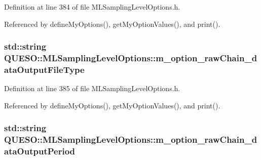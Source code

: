 Definition at line 384 of file M\-L\-Sampling\-Level\-Options.\-h.



Referenced by define\-My\-Options(), get\-My\-Option\-Values(), and print().

\hypertarget{class_q_u_e_s_o_1_1_m_l_sampling_level_options_a3cbc234ca24903ff9addc9a379bb69bf}{
\subsubsection[{m\-\_\-option\-\_\-raw\-Chain\-\_\-data\-Output\-File\-Type}]{\setlength{\rightskip}{0pt plus 5cm}std\-::string Q\-U\-E\-S\-O\-::\-M\-L\-Sampling\-Level\-Options\-::m\-\_\-option\-\_\-raw\-Chain\-\_\-data\-Output\-File\-Type\hspace{0.3cm}{\ttfamily [private]}}}\label{class_q_u_e_s_o_1_1_m_l_sampling_level_options_a3cbc234ca24903ff9addc9a379bb69bf}


Definition at line 385 of file M\-L\-Sampling\-Level\-Options.\-h.



Referenced by define\-My\-Options(), get\-My\-Option\-Values(), and print().

\hypertarget{class_q_u_e_s_o_1_1_m_l_sampling_level_options_a6fd76d8d884e3432274110a02f98086b}{
\subsubsection[{m\-\_\-option\-\_\-raw\-Chain\-\_\-data\-Output\-Period}]{\setlength{\rightskip}{0pt plus 5cm}std\-::string Q\-U\-E\-S\-O\-::\-M\-L\-Sampling\-Level\-Options\-::m\-\_\-option\-\_\-raw\-Chain\-\_\-data\-Output\-Period\hspace{0.3cm}{\ttfamily [private]}}}\label{class_q_u_e_s_o_1_1_m_l_sampling_level_options_a6fd76d8d884e3432274110a02f98086b}


